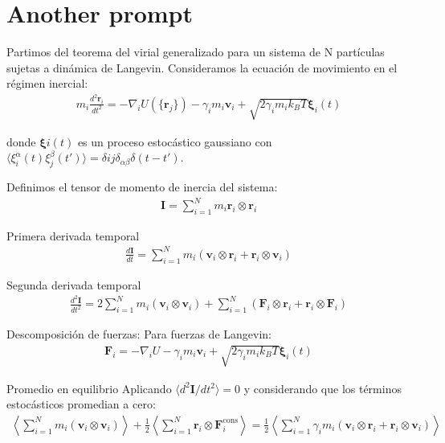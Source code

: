 \documentclass[../../main-notes.tex]{subfiles}
\begin{document}
\section{Another prompt}

Partimos del teorema del virial generalizado para un sistema de N partículas sujetas a dinámica de Langevin. Consideramos la ecuación de movimiento en el régimen inercial:
\begin{gather*}
m_i \frac{d^2\mathbf{r}_i}{dt^2} = -\nabla_i U(\{\mathbf{r}_j\}) - \gamma_i m_i \mathbf{v}_i + \sqrt{2\gamma_i m_i k_B T} \boldsymbol{\xi}_i(t)
\end{gather*}

donde $\boldsymbol{\xi}i(t)$ es un proceso estocástico gaussiano con $\langle \xi_i^\alpha(t) \xi_j^\beta(t') \rangle = \delta{ij}\delta_{\alpha\beta}\delta(t-t')$.

Definimos el tensor de momento de inercia del sistema:
\begin{gather*}
\mathbf{I} = \sum_{i=1}^N m_i \mathbf{r}_i \otimes \mathbf{r}_i
\end{gather*}

Primera derivada temporal
\begin{gather*}
\frac{d\mathbf{I}}{dt} = \sum_{i=1}^N m_i \left( \mathbf{v}_i \otimes \mathbf{r}_i + \mathbf{r}_i \otimes \mathbf{v}_i \right)
\end{gather*}

Segunda derivada temporal
\begin{gather*}
\frac{d^2\mathbf{I}}{dt^2} = 2\sum_{i=1}^N m_i (\mathbf{v}_i \otimes \mathbf{v}_i) + \sum_{i=1}^N \left( \mathbf{F}_i \otimes \mathbf{r}_i + \mathbf{r}_i \otimes \mathbf{F}_i \right)
\end{gather*}

Descomposición de fuerzas:
Para fuerzas de Langevin:
\begin{gather*}
\mathbf{F}_i = -\nabla_i U - \gamma_i m_i \mathbf{v}_i + \sqrt{2\gamma_i m_i k_B T} \boldsymbol{\xi}_i(t)
\end{gather*}

Promedio en equilibrio
Aplicando $\langle d^2\mathbf{I}/dt^2 \rangle = 0$ y considerando que los términos estocásticos promedian a cero:
\begin{gather*}
\left\langle \sum_{i=1}^N m_i (\mathbf{v}_i \otimes \mathbf{v}_i) \right\rangle + \frac{1}{2}\left\langle \sum_{i=1}^N \mathbf{r}_i \otimes \mathbf{F}_i^{\text{cons}} \right\rangle = \frac{1}{2}\left\langle \sum_{i=1}^N \gamma_i m_i (\mathbf{v}_i \otimes \mathbf{r}_i + \mathbf{r}_i \otimes \mathbf{v}_i) \right\rangle
\end{gather*}
\end{document}
